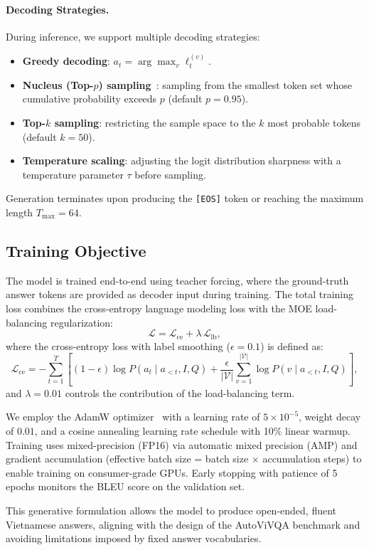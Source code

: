 \paragraph{Decoding Strategies.} During inference, we support multiple decoding strategies:
\begin{itemize}
    \item \textbf{Greedy decoding}: $a_t = \arg\max_{v} \ell_t^{(v)}$.
    \item \textbf{Nucleus (Top-$p$) sampling}~\cite{holtzman2020curious}: sampling from the smallest token set whose cumulative probability exceeds $p$ (default $p = 0.95$).
    \item \textbf{Top-$k$ sampling}: restricting the sample space to the $k$ most probable tokens (default $k = 50$).
    \item \textbf{Temperature scaling}: adjusting the logit distribution sharpness with a temperature parameter $\tau$ before sampling.
\end{itemize}
Generation terminates upon producing the \texttt{[EOS]} token or reaching the maximum length $T_{\max} = 64$.

\subsection{Training Objective}
\label{sec:method:training}

The model is trained end-to-end using teacher forcing, where the ground-truth answer tokens are provided as decoder input during training. The total training loss combines the cross-entropy language modeling loss with the MOE load-balancing regularization:
\begin{equation}
    \mathcal{L} = \mathcal{L}_{\text{ce}} + \lambda \, \mathcal{L}_{\text{lb}},
    \label{eq:total_loss}
\end{equation}
where the cross-entropy loss with label smoothing ($\epsilon = 0.1$) is defined as:
\begin{equation}
    \mathcal{L}_{\text{ce}} = - \sum_{t=1}^{T} \left[(1 - \epsilon) \log P(a_t \mid a_{<t}, I, Q) + \frac{\epsilon}{|\mathcal{V}|} \sum_{v=1}^{|\mathcal{V}|} \log P(v \mid a_{<t}, I, Q)\right],
    \label{eq:ce_loss}
\end{equation}
and $\lambda = 0.01$ controls the contribution of the load-balancing term.

We employ the AdamW optimizer~\cite{loshchilov2019decoupled} with a learning rate of $5 \times 10^{-5}$, weight decay of $0.01$, and a cosine annealing learning rate schedule with 10\% linear warmup. Training uses mixed-precision (FP16) via automatic mixed precision (AMP) and gradient accumulation (effective batch size = batch size $\times$ accumulation steps) to enable training on consumer-grade GPUs. Early stopping with patience of 5 epochs monitors the BLEU score on the validation set.

This generative formulation allows the model to produce open-ended, fluent Vietnamese answers, aligning with the design of the AutoViVQA benchmark and avoiding limitations imposed by fixed answer vocabularies.
